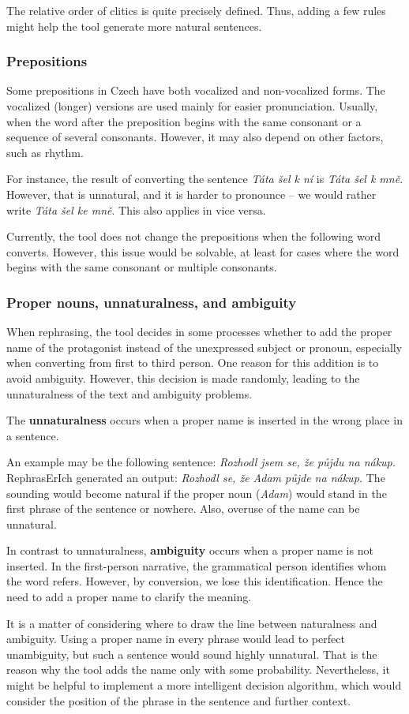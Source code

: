 The relative order of clitics is quite precisely defined. Thus, adding a few rules might help the tool generate more natural sentences.


\subsubsection{Prepositions}

Some prepositions in Czech have both vocalized and non-vocalized forms. The vocalized (longer) versions are used mainly for easier pronunciation. Usually, when the word after the preposition begins with the same consonant or a sequence of several consonants. However, it may also depend on other factors, such as rhythm. \cite{vlasin-slovnik}

For instance, the result of converting the sentence \emph{Táta šel k ní} is \emph{Táta šel k mně}. However, that is unnatural, and it is harder to pronounce -- we would rather write \emph{Táta šel ke mně}. This also applies in vice versa.

Currently, the tool does not change the prepositions when the following word converts. However, this issue would be solvable, at least for cases where the word begins with the same consonant or multiple consonants.


\subsubsection{Proper nouns, unnaturalness, and ambiguity}

When rephrasing, the tool decides in some processes whether to add the proper name of the protagonist instead of the unexpressed subject or pronoun, especially when converting from first to third person. One reason for this addition is to avoid ambiguity. However, this decision is made randomly, leading to the unnaturalness of the text and ambiguity problems.

The \textbf{unnaturalness} occurs when a proper name is inserted in the wrong place in a sentence.

An example may be the following sentence: \emph{Rozhodl jsem se, že půjdu na nákup.} RephrasErIch generated an output: \emph{Rozhodl se, že Adam půjde na nákup.} The sounding would become natural if the proper noun (\emph{Adam}) would stand in the first phrase of the sentence or nowhere. Also, overuse of the name can be unnatural.

In contrast to unnaturalness, \textbf{ambiguity} occurs when a proper name is not inserted. In the first-person narrative, the grammatical person identifies whom the word refers. However, by conversion, we lose this identification. Hence the need to add a proper name to clarify the meaning.

It is a matter of considering where to draw the line between naturalness and ambiguity. Using a proper name in every phrase would lead to perfect unambiguity, but such a sentence would sound highly unnatural. That is the reason why the tool adds the name only with some probability. Nevertheless, it might be helpful to implement a more intelligent decision algorithm, which would consider the position of the phrase in the sentence and further context.

